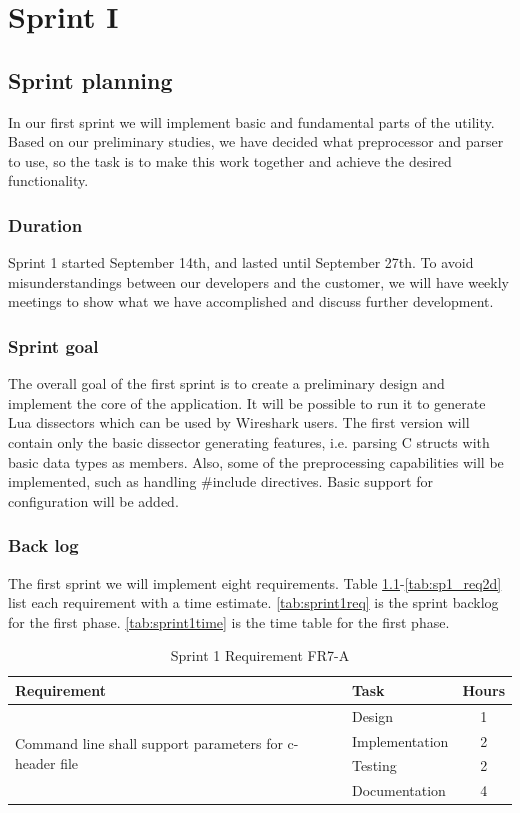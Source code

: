 \chapter{Sprint I}


\section{Sprint planning}
In our first sprint we will implement basic and fundamental parts of the
utility. Based on our preliminary studies, we have decided what preprocessor
and parser to use, so the task is to make this work together and achieve the
desired functionality.  

\subsection{Duration}
Sprint 1 started September 14th, and lasted until September 27th. To avoid
misunderstandings between our developers and the customer, we will have weekly
meetings to show what we have accomplished and discuss further development. 

\subsection{Sprint goal}
The overall goal of the first sprint is to create a preliminary design and
implement the core of the application. It will be possible to run it to
generate Lua dissectors which can be used by Wireshark users. The first
version will contain only the basic dissector generating features, i.e.
parsing C structs with basic data types as members. Also, some of the
preprocessing capabilities will be implemented, such as handling \#include
directives. Basic support for configuration will be added.

\subsection{Back log}
The first sprint we will implement eight requirements. Table
\ref{tab:sp1_req7a}-\ref{tab:sp1_req2d}  list each requirement with a time
estimate. \autoref{tab:sprint1req} is the sprint backlog for the first phase.
\autoref{tab:sprint1time} is the time table for the first phase.

\begin{table}[!ht] \small \center
\caption{Sprint 1 Requirement FR7-A\label{tab:sp1_req7a}}
\begin{tabular}{l l c}
	\toprule
	Requirement & Task & Hours \\
	\midrule
	\multirow{4}{5cm}{Command line shall support parameters for c-header file} & Design & 1 \\
	& Implementation & 2 \\
	& Testing & 2 \\
	& Documentation & 4 \\
	\bottomrule
\end{tabular}
\end{table}

